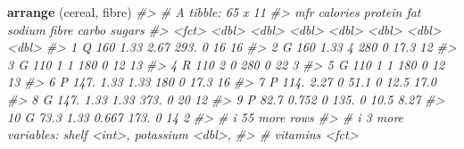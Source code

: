 \documentclass[
]{book}
\newenvironment{Shaded}{\begin{snugshade}}{\end{snugshade}}
\newcommand{\CommentTok}[1]{\textcolor[rgb]{0.56,0.35,0.01}{\textit{#1}}}
\newcommand{\FunctionTok}[1]{\textcolor[rgb]{0.13,0.29,0.53}{\textbf{#1}}}
\newcommand{\NormalTok}[1]{#1}
\begin{document}
\begin{Shaded}
\begin{Highlighting}[]
\FunctionTok{arrange}\NormalTok{ (cereal, fibre)}
\CommentTok{\#\textgreater{} \# A tibble: 65 x 11}
\CommentTok{\#\textgreater{}    mfr   calories protein   fat sodium fibre carbo sugars}
\CommentTok{\#\textgreater{}    \textless{}fct\textgreater{}    \textless{}dbl\textgreater{}   \textless{}dbl\textgreater{} \textless{}dbl\textgreater{}  \textless{}dbl\textgreater{} \textless{}dbl\textgreater{} \textless{}dbl\textgreater{}  \textless{}dbl\textgreater{}}
\CommentTok{\#\textgreater{}  1 Q        160     1.33  2.67   293.      0  16    16   }
\CommentTok{\#\textgreater{}  2 G        160     1.33  4      280       0  17.3  12   }
\CommentTok{\#\textgreater{}  3 G        110     1     1      180       0  12    13   }
\CommentTok{\#\textgreater{}  4 R        110     2     0      280       0  22     3   }
\CommentTok{\#\textgreater{}  5 G        110     1     1      180       0  12    13   }
\CommentTok{\#\textgreater{}  6 P        147.    1.33  1.33   180       0  17.3  16   }
\CommentTok{\#\textgreater{}  7 P        114.    2.27  0       51.1     0  12.5  17.0 }
\CommentTok{\#\textgreater{}  8 G        147.    1.33  1.33   373.      0  20    12   }
\CommentTok{\#\textgreater{}  9 P         82.7   0.752 0      135.      0  10.5   8.27}
\CommentTok{\#\textgreater{} 10 G         73.3   1.33  0.667  173.      0  14     2   }
\CommentTok{\#\textgreater{} \# i 55 more rows}
\CommentTok{\#\textgreater{} \# i 3 more variables: shelf \textless{}int\textgreater{}, potassium \textless{}dbl\textgreater{},}
\CommentTok{\#\textgreater{} \#   vitamins \textless{}fct\textgreater{}}


\end{Highlighting}
\end{Shaded}
\end{document}
